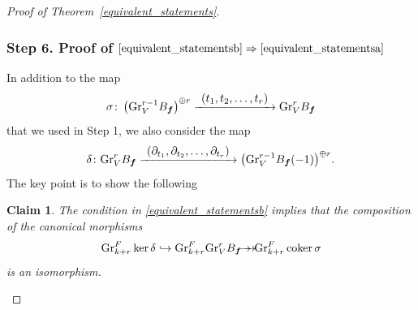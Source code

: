 \documentclass[JEP,XML,SOM,Unicode]{cedram}
\newcommand{\To}[1]{\mathchoice{\xrightarrow{\textstyle\kern4pt#1\kern3pt}}{\stackrel{#1}{\longrightarrow}}{}{}}
\newcommand\hto{\mathrel{\lhook\joinrel\to}}
\newcommand{\onto}{\mathchoice{\to\hspace*{-5mm}\to}{\to\hspace*{-2.85mm}\to}{\to\hspace*{-3mm}\to}{\to\hspace*{-3mm}\to}}
\newtheorem*{claim*}{Claim}
\theoremstyle{plain}
\theoremstyle{definition}
\newcommand\bff{{\boldsymbol f}}
\newcommand\gr{\mathrm{Gr}}
\DeclareMathOperator{\coker}{coker}
\begin{document}
\begin{proof}[Proof of Theorem~\ref{equivalent_statements}]
\subsubsection*{Step 6. Proof of $\eqref{equivalent_statementsb}\Rightarrow\eqref{equivalent_statementsa}$}
In addition to the map
\[
\sigma\colon \left(\gr^{r-1}_V B_\bff\right)^{\oplus r} \To{(t_1,t_2,\dots,t_r)} \gr^{r}_V B_\bff
\]
that we used in Step 1, we also consider the map
\[
\delta\colon \gr^r_V B_\bff \To{(\partial_{t_1},\partial_{t_2},\dots,\partial_{t_r})} \big(\gr^{r-1}_V B_\bff(-1)\big)^{\oplus r}.
\]
The key point is to show the following

\begin{claim*}
The condition in \eqref{equivalent_statementsb} implies that
the composition of the canonical morphisms
\begin{equation}\label{eq:ckc}
\gr^F_{k+r}\ker\delta \hto \gr^F_{k+r}\gr^r_V B_\bff \onto \gr^F_{k+r} \coker\sigma
\end{equation}
is an isomorphism.
\end{claim*}


\end{proof}
\end{document}
